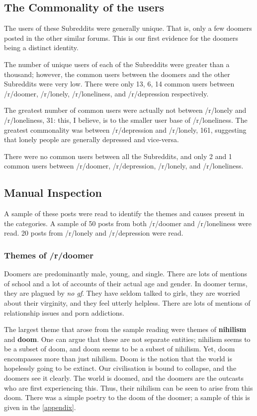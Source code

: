 \documentclass[../report.tex]{subfiles}
\begin{document}
\subsection{The Commonality of the users}
The users of these Subreddits were generally unique.
That is, only a few doomers posted in the other similar forums. 
This is our first evidence for the doomers being a distinct identity. 

The number of unique users of each of the Subreddits were greater than a thousand; however, the common users between the doomers and the other Subreddits were very low. 
There were only 13, 6, 14 common users between /r/doomer, /r/lonely, /r/loneliness, and /r/depression respectively. 

The greatest number of common users were actually not between /r/lonely and /r/loneliness, 31: this, I believe, is to the smaller user base of /r/loneliness. 
The greatest commonality was between /r/depression and /r/lonely, 161, suggesting that lonely people are generally depressed and vice-versa.

There were no common users between all the Subreddits, and only 2 and 1 common users between /r/doomer, /r/depression, /r/lonely, and /r/loneliness.

\subsection{Manual Inspection}
A sample of these posts were read to identify the themes and causes present in the categories.
A sample of 50 posts from both /r/doomer and /r/loneliness were read. 20 posts from /r/lonely and /r/depression were read. 

\subsubsection{Themes of /r/doomer}
Doomers are predominantly male, young, and single. 
There are lots of mentions of school and a lot of accounts of their actual age and gender. 
In doomer terms, they are plagued by \textit{no gf}. 
They have seldom talked to girls, they are worried about their virginity, and they feel utterly helpless. 
There are lots of mentions of relationship issues and porn addictions. 

The largest theme that arose from the sample reading were themes of \textbf{nihilism} and \textbf{doom}. 
One can argue that these are not separate entities; nihilism seems to be a subset of doom, and doom seems to be a subset of nihilism.
Yet, doom encompasses more than just nihilism.
Doom is the notion that the world is hopelessly going to be extinct. 
Our civilisation is bound to collapse, and the doomers see it clearly.
The world is doomed, and the doomers are the outcasts who are first experiencing this. 
Thus, their nihilism can be seen to arise from this doom. 
There was a simple poetry to the doom of the doomer; a sample of this is given in the \ref{appendix}.
\end{document}
